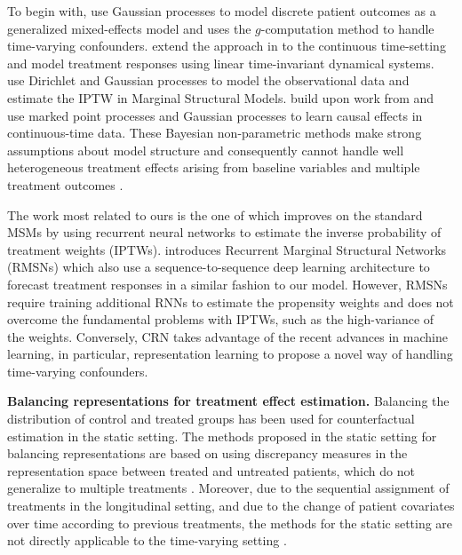 \documentclass{article} %
\begin{document}
	To begin with, \cite{xu2016bayesian} use Gaussian processes to model discrete patient outcomes as a generalized mixed-effects model and uses the $g$-computation method to handle time-varying confounders. \citet{soleimani2017treatment} extend the approach in \citet{xu2016bayesian} to the continuous time-setting and model treatment responses using linear time-invariant dynamical systems. \cite{roy2016bayesian} use Dirichlet and Gaussian processes to model the observational data and estimate the IPTW in Marginal Structural Models. \cite{schulam2017reliable} build upon work from \cite{lok2008statistical, arjas2004causal} and use marked point processes and Gaussian processes to learn causal effects in continuous-time data. These Bayesian non-parametric methods make strong assumptions about model structure and consequently cannot handle well heterogeneous treatment effects arising from baseline variables \citep{soleimani2017treatment, schulam2017reliable} and multiple treatment outcomes \citep{xu2016bayesian, schulam2017reliable}. 
	
	 The work most related to ours is the one of \citet{lim2018forecasting} which improves on the standard MSMs by using recurrent neural networks to estimate the inverse probability of treatment weights (IPTWs). \cite{lim2018forecasting} introduces Recurrent Marginal Structural Networks (RMSNs) which also use a sequence-to-sequence deep learning architecture to forecast treatment responses in a similar fashion to our model. However, RMSNs require training additional RNNs to estimate the propensity weights and does not overcome the fundamental problems with IPTWs, such as the high-variance of the weights. Conversely, CRN takes advantage of the recent advances in machine learning, in particular, representation learning to propose a novel way of handling time-varying confounders. 
			
	\textbf{Balancing representations for treatment effect estimation.} Balancing the distribution of control and treated groups has been used for counterfactual estimation in the static setting. The methods proposed in the static setting for balancing representations are based on using discrepancy measures in the representation space between treated and untreated patients, which do not generalize to multiple treatments \citep{johansson2016learning, shalit2017estimating, li2017matching, yao2018representation}. Moreover, due to the sequential assignment of treatments in the longitudinal setting, and due to the change of patient covariates over time according to previous treatments, the methods for the static setting are not directly applicable to the time-varying setting \citep{hernan2000marginal, mansournia2012effect}.
\end{document}

